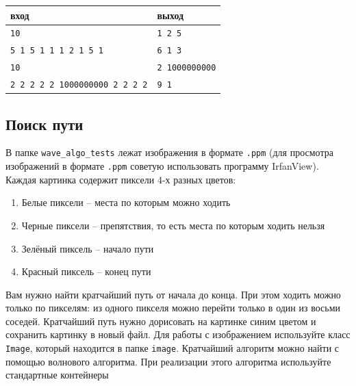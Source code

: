 \documentclass{article}
\begin{document}
\begin{center}
\begin{tabular}{ l | l }
 вход & выход \\ \hline
 \texttt{10} & \texttt{1 2 5}\\
 \texttt{5 1 5 1 1 1 2 1 5 1} & \texttt{6 1 3} \\ \hline
 \texttt{10} & \texttt{2 1000000000}\\
 \texttt{2 2 2 2 2 1000000000 2 2 2 2} & \texttt{9 1} \\
\end{tabular}
\end{center}

\subsection{Поиск пути}
В папке \texttt{wave\_algo\_tests} лежат изображения в формате \texttt{.ppm} (для просмотра изображений в формате \texttt{.ppm} советую использовать программу IrfanView).  Каждая картинка содержит пиксели 4-х разных цветов:
\begin{enumerate}
\item Белые пиксели -- места по которым можно ходить
\item Черные пиксели -- препятствия, то есть места по которым ходить нельзя
\item Зелёный пиксель -- начало пути
\item Красный пиксель -- конец пути
\end{enumerate}
Вам нужно найти кратчайший путь от начала до конца. При этом ходить можно только по пикселям: из одного пикселя можно перейти только в один из восьми соседей.
Кратчайший путь нужно дорисовать на картинке синим цветом и сохранить картинку в новый файл. 
Для работы с изображением используйте класс \texttt{Image}, который находится в папке \texttt{image}.
Кратчайший алгоритм можно найти с помощью волнового алгоритма. При реализации этого алгоритма используйте стандартные контейнеры
\end{document}

